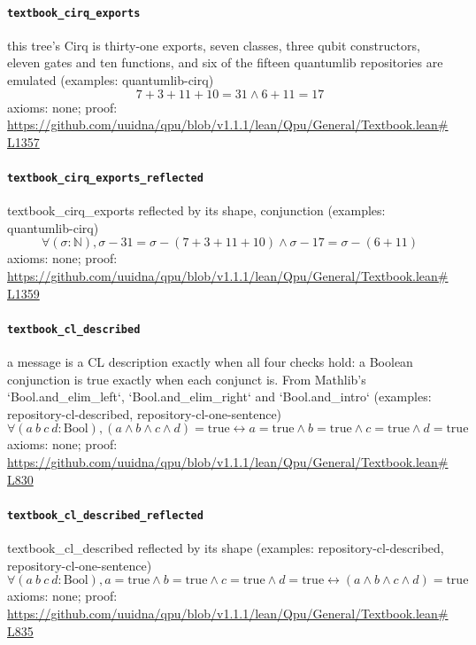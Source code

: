 \documentclass[11pt]{article}
\begin{document}
\paragraph{\texttt{textbook\_cirq\_exports}}
this tree's Cirq is thirty-one exports, seven classes, three qubit constructors, eleven gates and ten functions, and six of the fifteen quantumlib repositories are emulated (examples: quantumlib-cirq)
\[ 7 + 3 + 11 + 10 = 31 \land 6 + 11 = 17 \]
\noindent axioms: none; proof: \url{https://github.com/uuidna/qpu/blob/v1.1.1/lean/Qpu/General/Textbook.lean\#L1357}

\paragraph{\texttt{textbook\_cirq\_exports\_reflected}}
textbook\_cirq\_exports reflected by its shape, conjunction (examples: quantumlib-cirq)
\[ \forall (\sigma : \mathbb{N}), \sigma - 31 = \sigma - (7 + 3 + 11 + 10) \land \sigma - 17 = \sigma - (6 + 11) \]
\noindent axioms: none; proof: \url{https://github.com/uuidna/qpu/blob/v1.1.1/lean/Qpu/General/Textbook.lean\#L1359}

\paragraph{\texttt{textbook\_cl\_described}}
a message is a CL description exactly when all four checks hold: a Boolean conjunction is true exactly when each conjunct is. From Mathlib's `Bool.and\_elim\_left`, `Bool.and\_elim\_right` and `Bool.and\_intro` (examples: repository-cl-described, repository-cl-one-sentence)
\[ \forall (a\ b\ c\ d : \mathrm{Bool}), (a \land b \land c \land d) = \mathrm{true} \leftrightarrow a = \mathrm{true} \land b = \mathrm{true} \land c = \mathrm{true} \land d = \mathrm{true} \]
\noindent axioms: none; proof: \url{https://github.com/uuidna/qpu/blob/v1.1.1/lean/Qpu/General/Textbook.lean\#L830}

\paragraph{\texttt{textbook\_cl\_described\_reflected}}
textbook\_cl\_described reflected by its shape (examples: repository-cl-described, repository-cl-one-sentence)
\[ \forall (a\ b\ c\ d : \mathrm{Bool}), a = \mathrm{true} \land b = \mathrm{true} \land c = \mathrm{true} \land d = \mathrm{true} \leftrightarrow (a \land b \land c \land d) = \mathrm{true} \]
\noindent axioms: none; proof: \url{https://github.com/uuidna/qpu/blob/v1.1.1/lean/Qpu/General/Textbook.lean\#L835}
\end{document}
